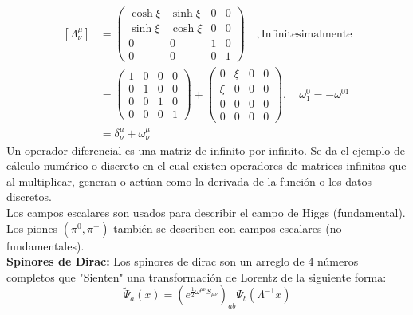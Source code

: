 \documentclass[../main.tex]{subfiles}
\begin{document}
\begin{align*}
  \left[ \Lambda^\mu_\nu \right] & = \begin{pmatrix} \cosh \xi & \sinh \xi & 0 & 0 \\
    \sinh \xi & \cosh \xi & 0 & 0 \\
    0 & 0 & 1 & 0 \\
    0 & 0 & 0 & 1
  \end{pmatrix}\quad, \text{Infinitesimalmente} \\
  & = \begin{pmatrix}
    1 & 0 & 0 & 0 \\
    0 & 1 & 0 & 0 \\
    0 & 0 & 1 & 0 \\
    0 & 0 & 0 & 1
  \end{pmatrix}
  + \begin{pmatrix}
    0 & \xi & 0 & 0 \\
    \xi & 0 & 0 & 0 \\
    0 & 0 & 0 & 0 \\
    0 & 0 & 0 & 0
  \end{pmatrix}, \quad \omega^0_1 = - \omega^{01} \\
  & = \delta^\mu_\nu + \omega_\nu^\mu
\end{align*}
Un operador diferencial es una matriz de infinito por infinito. Se da el ejemplo de cálculo numérico o discreto en el cual existen operadores de matrices infinitas que al multiplicar, generan o actúan como la derivada de la función o los datos discretos.\\
Los campos escalares son usados para describir el campo de Higgs (fundamental). \\
Los piones $(\pi^0,\pi^+)$ también se describen con campos escalares (no fundamentales). \\
\textbf{Spinores de Dirac:} Los spinores de dirac son un arreglo de 4 números completos que "Sienten" una transformación de Lorentz de la siguiente forma:
\begin{equation}
  \tilde{\Psi}_a(x) = \left( e^{\frac{1}{2}\omega^{\mu\nu}S_{\mu \nu}} \right)_{ab}\Psi_b \left( \Lambda^{-1}x \right)
\end{equation}
\end{document}

